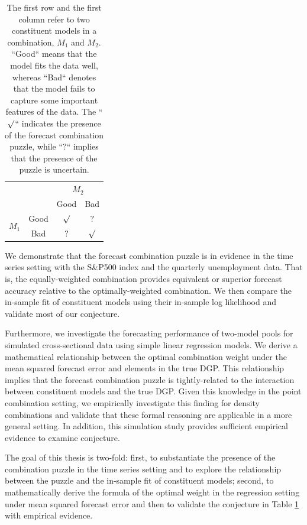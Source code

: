 \documentclass{monashthesis}
\begin{document}
\begin{table}[ht]
\centering
\begin{tabular}{cccc}
                       &      & \multicolumn{2}{c}{$M_2$} \\
                       &      & Good       & Bad       \\
\multirow{2}{*}{$M_1$} & Good & $\surd$    & $?$ \\
                       & Bad  & $?$        & $\surd$
\end{tabular}
\caption{The first row and the first column refer to two constituent models in a combination, $M_1$ and $M_2$. ``Good`` means that the model fits the data well, whereas ``Bad`` denotes that the model fails to capture some important features of the data. The ``$\surd$`` indicates the presence of the forecast combination puzzle, while ``$?$`` implies that the presence of the puzzle is uncertain.}
\label{tab:1}
\end{table}

We demonstrate that the forecast combination puzzle is in evidence in the time series setting with the S\&P500 index and the quarterly unemployment data. That is, the equally-weighted combination provides equivalent or superior forecast accuracy relative to the optimally-weighted combination. We then compare the in-sample fit of constituent models using their in-sample log likelihood and validate most of our conjecture.

Furthermore, we investigate the forecasting performance of two-model pools for simulated cross-sectional data using simple linear regression models. We derive a mathematical relationship between the optimal combination weight under the mean squared forecast error and elements in the true DGP. This relationship implies that the forecast combination puzzle is tightly-related to the interaction between constituent models and the true DGP. Given this knowledge in the point combination setting, we empirically investigate this finding for density combinations and validate that these formal reasoning are applicable in a more general setting. In addition, this simulation study provides sufficient empirical evidence to examine conjecture.

The goal of this thesis is two-fold: first, to substantiate the presence of the combination puzzle in the time series setting and to explore the relationship between the puzzle and the in-sample fit of constituent models; second, to mathematically derive the formula of the optimal weight in the regression setting under mean squared forecast error and then to validate the conjecture in Table \ref{tab:1} with empirical evidence.
\end{document}
